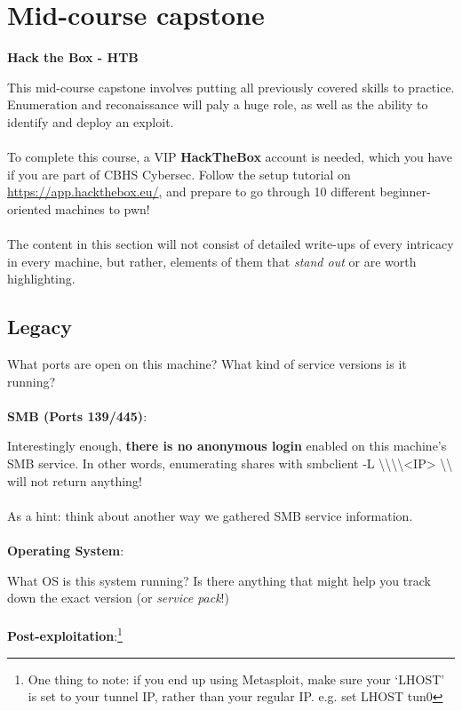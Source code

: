 \documentclass[a4paper,11pt]{article}
\renewcommand{\tt}[2][tt]{\textcolor{#1}{\ttfamily #2}}%
\begin{document}
\section{Mid-course capstone}


\begin{center}
    {\bfseries Hack the Box - HTB}
\end{center}
This mid-course capstone involves putting all previously covered skills to practice. Enumeration and reconaissance will paly a huge role, as well as the ability to identify and deploy an exploit. 
\\
\\
To complete this course, a VIP {\bfseries HackTheBox} account is needed, which you have if you are part of CBHS Cybersec. Follow the setup tutorial on \url{https://app.hackthebox.eu/}, and prepare to go through 10 different beginner-oriented machines to pwn! 
\\
\\
The content in this section will not consist of detailed write-ups of every intricacy in every machine, but rather, elements of them that \textit{stand out} or are worth highlighting.

\begin{center}
\subsection{Legacy}
\end{center}

What ports are open on this machine? What kind of service versions is it running?
\\
\\
{\bfseries SMB (Ports 139/445)}:

Interestingly enough, {\bfseries there is no anonymous login} enabled on this machine's SMB service.
In other words, enumerating shares with \tt{smbclient -L \textbackslash \textbackslash \textbackslash \textbackslash <IP> \textbackslash \textbackslash} will not return anything!
\\
\\
As a hint: think about another way we gathered SMB service information.
\\
\\
{\bfseries Operating System}:

What OS is this system running? Is there anything that might help you track down the exact version (or \textit{service pack}!)
\\
\\
{\bfseries Post-exploitation}:\footnote[2]{One thing to note: if you end up using Metasploit, make sure your `LHOST' is set to your tunnel IP, rather than your regular IP. e.g. \tt{set LHOST tun0}}
\end{document}
